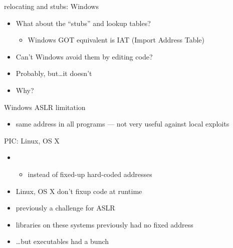 \begin{frame}{relocating and stubs: Windows}
    \begin{itemize}
        \item What about the ``stubs'' and lookup tables?
            \begin{itemize}
                \item Windows GOT equivalent is IAT (Import Address Table)
            \end{itemize}
        \item Can't Windows avoid them by editing code?
        \item Probably, but\ldots it doesn't
        \item Why?
    \end{itemize}
\end{frame}

\begin{frame}{Windows ASLR limitation}
    \begin{itemize}
        \item same address in all programs --- not very useful against local exploits
    \end{itemize}
\end{frame}

\begin{frame}{PIC: Linux, OS X}
    \begin{itemize}
        \item {}
            \begin{itemize}
                \item instead of fixed-up hard-coded addresses
            \end{itemize}
        \item Linux, OS X don't fixup code at runtime
        \item previously a challenge for ASLR
        \item libraries on these systems previously had no fixed address
        \item \ldots but executables had a bunch
    \end{itemize}
\end{frame}

